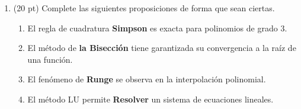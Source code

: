 \documentclass[11pt]{article}
\begin{document}
\begin{enumerate}
\begin{enumerate}
\vspace{1cm}
\item (20 pt) Complete las siguientes proposiciones de forma que sean ciertas.

\vspace{1cm}
\begin{enumerate}
	\item El regla de cuadratura \textbf{Simpson} es exacta para polinomios de grado $3$. 
    \item \vspace{5mm} El m\'etodo de \textbf{la Bisecci\'on} tiene garantizada su convergencia a la ra\'iz de una funci\'on.
    \item \vspace{5mm} El fen\'omeno de \textbf{Runge} se observa en la interpolaci\'on polinomial.
   	\item \vspace{5mm} El m\'etodo LU permite \textbf{Resolver} un sistema de ecuaciones lineales.
\end{enumerate}
\end{enumerate}
\end{enumerate}
\end{document}
